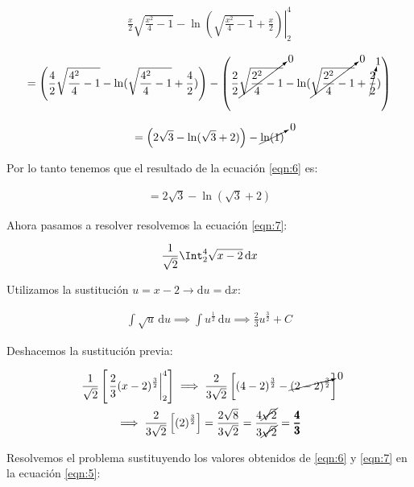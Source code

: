 \documentclass[12pt]{article}
\begin{document}
\begin{align*}
	\left.\frac{x}{2}\sqrt{\frac{x^2}{4}-1}-\ln\left(\sqrt{\frac{x^2}{4}-1}+\frac{x}{2}\right)\right|_2^4
\end{align*}

\begin{align*}
	=\left(\frac{4}{2}\sqrt{\frac{4^2}{4}-1} - \ln(\sqrt{\frac{4^2}{4}-1}+\frac{4}{2})\right) - \left(\frac{2}{2}\cancelto{0}{\sqrt{\frac{2^2}{4}-1}} - \ln(\cancelto{0}{\sqrt{\frac{2^2}{4}-1}}+\cancelto{1}{\frac{2}{2}})\right)
\end{align*}

\begin{align*}
	=\left(2\sqrt{3} - \ln(\sqrt{3}+2)\right) - \cancelto{0}{\ln(1)}
\end{align*}

\noindent Por lo tanto tenemos que el resultado de la ecuación \eqref{eqn:6} es:

\begin{align*}
	=2\sqrt{3} - \ln(\sqrt{3}+2)
\end{align*}

\noindent Ahora pasamos a resolver resolvemos la ecuación \eqref{eqn:7}:

\begin{align*}
	\frac{1}{\sqrt{2}} \Int_2^4 \sqrt{x-2}\, \mathrm{d}x
\end{align*}

\noindent Utilizamos la sustitución $u=x-2 \to \mathrm{d}u = \mathrm{d}x$:

\begin{align*}
	\int \sqrt{u}\, \mathrm{d}u \implies \int u^{\frac{1}{2}}\, \mathrm{d}u \implies \frac{2}{3}u^{\frac{3}{2}} + C
\end{align*}

\noindent Deshacemos la sustitución previa:

\begin{multline*}
	\frac{1}{\sqrt{2}}\left[\left.\frac{2}{3}(x-2)^{\frac{3}{2}}\right|_2^4\right] \implies \frac{2}{3\sqrt{2}} \left[(4-2)^{\frac{3}{2}} - \cancelto{0}{(2-2)^{\frac{3}{2}}}\right]\\ \implies \frac{2}{3\sqrt{2}} \left[(2)^{\frac{3}{2}}\right] = \frac{2\sqrt{8}}{3\sqrt{2}} = \frac{4\cancel{\sqrt{2}}}{3\cancel{\sqrt{2}}} = \pmb{\frac{4}{3}}
\end{multline*}

\noindent Resolvemos el problema sustituyendo los valores obtenidos de \eqref{eqn:6} y \eqref{eqn:7} en la ecuación \eqref{eqn:5}:
\end{document}
